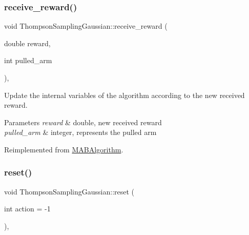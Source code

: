 \mbox{\label{class_thompson_sampling_gaussian_a21d02f760e6738a8e209f46e57ffa341}} 
\subsubsection{\texorpdfstring{receive\+\_\+reward()}{receive\_reward()}}
{\footnotesize\ttfamily void Thompson\+Sampling\+Gaussian\+::receive\+\_\+reward (\begin{DoxyParamCaption}\item[{double}]{reward,  }\item[{int}]{pulled\+\_\+arm }\end{DoxyParamCaption})\hspace{0.3cm}{\ttfamily [override]}, {\ttfamily [virtual]}}



Update the internal variables of the algorithm according to the new received reward. 


\begin{DoxyParams}{Parameters}
{\em reward} & double, new received reward \\
\hline
{\em pulled\+\_\+arm} & integer, represents the pulled arm \\
\hline
\end{DoxyParams}


Reimplemented from \mbox{\hyperlink{class_m_a_b_algorithm_aa584b3d6b86fa050e3389be9781b5782}{M\+A\+B\+Algorithm}}.

\mbox{\label{class_thompson_sampling_gaussian_a847a421af9da4c81c10c395ebde1d8c8}} 
\subsubsection{\texorpdfstring{reset()}{reset()}}
{\footnotesize\ttfamily void Thompson\+Sampling\+Gaussian\+::reset (\begin{DoxyParamCaption}\item[{int}]{action = {\ttfamily -\/1} }\end{DoxyParamCaption})\hspace{0.3cm}{\ttfamily [override]}, {\ttfamily [virtual]}}



